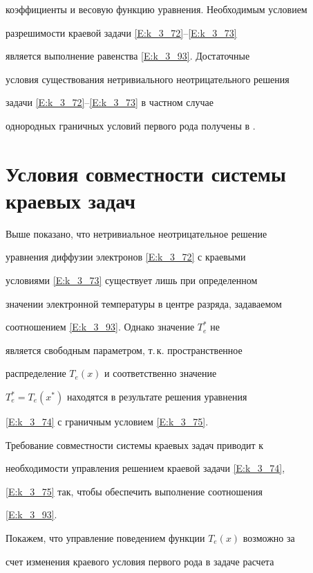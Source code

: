коэффициенты и весовую функцию уравнения. Необходимым условием


разрешимости краевой задачи \eqref{E:k_3_72}--\eqref{E:k_3_73}


является выполнение равенства \eqref{E:k_3_93}. Достаточные


условия существования нетривиального неотрицательного решения


задачи \eqref{E:k_3_72}--\eqref{E:k_3_73} в частном случае


однородных граничных условий первого рода получены в \cite{MM30}.








\section{Условия совместности системы краевых задач}








Выше показано, что нетривиальное неотрицательное решение


уравнения диффузии электронов \eqref{E:k_3_72} с краевыми


условиями \eqref{E:k_3_73} существует лишь при определенном


значении электронной температуры в центре разряда, задаваемом


соотношением \eqref{E:k_3_93}. Однако значение $T_e^\ast$ не


является свободным параметром, т.\,к. пространственное


распределение $T_e(x)$ и соответственно значение


$T_e^\ast=T_e(x^\ast)$ находятся в результате решения уравнения


\eqref{E:k_3_74} с граничным условием \eqref{E:k_3_75}.


Требование совместности системы краевых задач приводит к


необходимости управления решением краевой задачи \eqref{E:k_3_74},


\eqref{E:k_3_75} так, чтобы обеспечить выполнение соотношения


\eqref{E:k_3_93}.





Покажем, что управление поведением функции $T_e(x)$ возможно за


счет изменения краевого условия первого рода в задаче расчета


